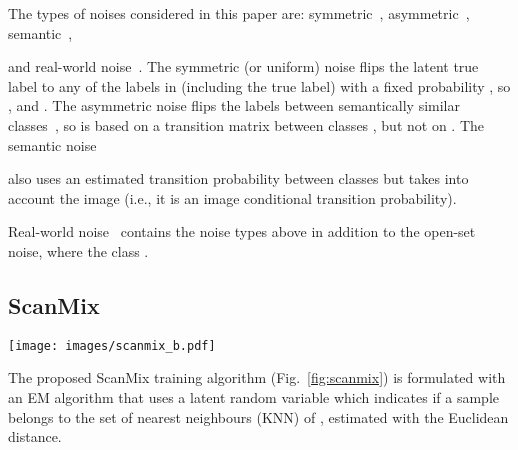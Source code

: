 \documentclass[review]{elsarticle}
\theoremstyle{plain}
\begin{document}
The types of noises considered in this paper are: symmetric~\citep{kim2019nlnl}, asymmetric~\citep{patrini2017making},  
semantic~\citep{rog}, 

and real-world noise~\citep{jiang2020beyond,li2017webvision,xiao2015learning}.
The symmetric (or uniform) noise flips the latent true label  to any of the labels in  (including the true label) with a fixed probability , so  , and . 
The asymmetric noise flips the labels between semantically similar classes~\citep{patrini2017making}, so  is based on a transition matrix between classes , but not on . 
The semantic noise~\citep{rog} 

also uses an estimated transition probability between classes  but takes into account the image  (i.e., it is an image conditional transition probability).

Real-world noise~\citep{jiang2020beyond,li2017webvision,xiao2015learning} contains the noise types above in addition to the open-set noise, where the class .



\subsection{ScanMix}
\label{sec:scanmix}



\begin{figure*}
\centering
  \texttt{[image: images/scanmix\_b.pdf]}
  \caption{ScanMix has a pre-training stage consisting of a self-supervised training~\citep{SimCLR,MoCo,MoCoV2,SCAN}, where we use contrastive loss to approximate features to its data augmented variants, in the feature space, while repelling representations from negative examples. In the training stage we first warm-up the classifier using a simple classification loss.  Then, using the classification loss, we train the GMM to separate the samples into a clean set  and a noisy set  that are "MixMatched"~\citep{MixMatch} for SSL training.  In parallel to this SSL training, we use the classification results and feature representations to train the semantic clustering.  Please see  Algorithm~\ref{alg:SM} for more details.}
  \label{fig:scanmix}
\end{figure*}


The proposed ScanMix training algorithm (Fig.~\ref{fig:scanmix}) is formulated with an EM algorithm that uses a latent random variable  which indicates if a sample  belongs to the set of  nearest neighbours (KNN) of , estimated with the Euclidean distance.
\end{document}
